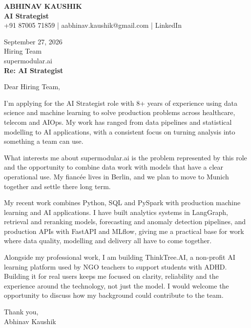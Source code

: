 \documentclass[10pt,a4paper]{article}
\begin{document}
\begin{center}
{\Large\bfseries ABHINAV KAUSHIK}\\[2pt]
{\bfseries AI Strategist}\\[2pt]
+91 87005 71859 \quad | \quad aabhinav.kaushik@gmail.com \quad | \quad LinkedIn
\end{center}
\vspace{8pt}
September 27, 2026\\[6pt]
Hiring Team\\
supermodular.ai\\[4pt]
\textbf{Re: AI Strategist}

Dear Hiring Team,

I’m applying for the AI Strategist role with 8+ years of experience using data science and machine learning to solve production problems across healthcare, telecom and AIOps. My work has ranged from data pipelines and statistical modelling to AI applications, with a consistent focus on turning analysis into something a team can use.

What interests me about supermodular.ai is the problem represented by this role and the opportunity to combine data work with models that have a clear operational use. My fiancée lives in Berlin, and we plan to move to Munich together and settle there long term.

My recent work combines Python, SQL and PySpark with production machine learning and AI applications. I have built analytics systems in LangGraph, retrieval and reranking models, forecasting and anomaly detection pipelines, and production APIs with FastAPI and MLflow, giving me a practical base for work where data quality, modelling and delivery all have to come together.

Alongside my professional work, I am building ThinkTree.AI, a non-profit AI learning platform used by NGO teachers to support students with ADHD. Building it for real users keeps me focused on clarity, reliability and the experience around the technology, not just the model. I would welcome the opportunity to discuss how my background could contribute to the team.

Thank you,\\
Abhinav Kaushik
\end{document}

